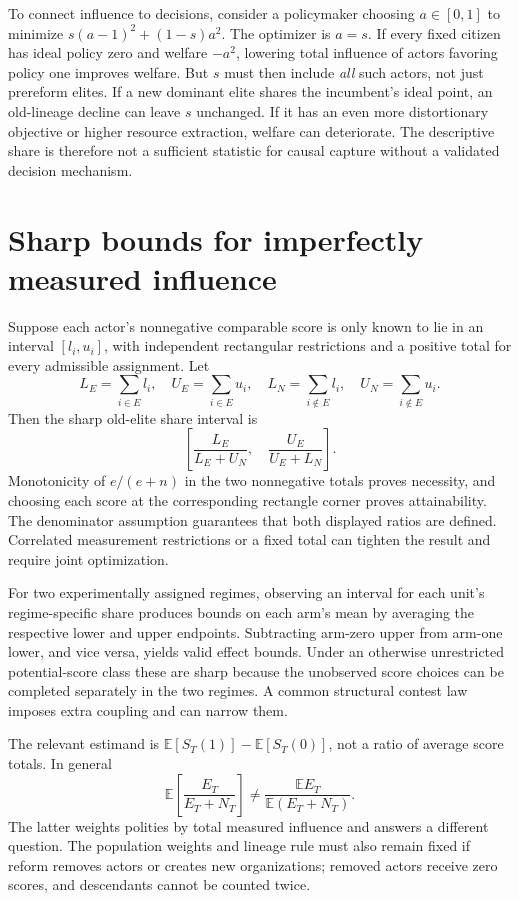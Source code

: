\documentclass[11pt]{article}
\newcommand{\E}{\mathbb E}
\begin{document}
To connect influence to decisions, consider a policymaker choosing $a\in[0,1]$ to minimize $s(a-1)^2+(1-s)a^2$. The optimizer is $a=s$. If every fixed citizen has ideal policy zero and welfare $-a^2$, lowering total influence of actors favoring policy one improves welfare. But $s$ must then include \emph{all} such actors, not just prereform elites. If a new dominant elite shares the incumbent's ideal point, an old-lineage decline can leave $s$ unchanged. If it has an even more distortionary objective or higher resource extraction, welfare can deteriorate. The descriptive share is therefore not a sufficient statistic for causal capture without a validated decision mechanism.

\section*{Sharp bounds for imperfectly measured influence}
Suppose each actor's nonnegative comparable score is only known to lie in an interval $[l_i,u_i]$, with independent rectangular restrictions and a positive total for every admissible assignment. Let
\[
 L_E=\sum_{i\in E}l_i,\quad U_E=\sum_{i\in E}u_i,
 \quad L_N=\sum_{i\notin E}l_i,\quad U_N=\sum_{i\notin E}u_i.
\]
Then the sharp old-elite share interval is
\[
 \left[\frac{L_E}{L_E+U_N},\quad
       \frac{U_E}{U_E+L_N}\right].\tag{2}
\]
Monotonicity of $e/(e+n)$ in the two nonnegative totals proves necessity, and choosing each score at the corresponding rectangle corner proves attainability. The denominator assumption guarantees that both displayed ratios are defined. Correlated measurement restrictions or a fixed total can tighten the result and require joint optimization.

For two experimentally assigned regimes, observing an interval for each unit's regime-specific share produces bounds on each arm's mean by averaging the respective lower and upper endpoints. Subtracting arm-zero upper from arm-one lower, and vice versa, yields valid effect bounds. Under an otherwise unrestricted potential-score class these are sharp because the unobserved score choices can be completed separately in the two regimes. A common structural contest law imposes extra coupling and can narrow them.

The relevant estimand is $\E[S_T(1)]-\E[S_T(0)]$, not a ratio of average score totals. In general
\[
 \E\left[\frac{E_T}{E_T+N_T}\right]
 \ne\frac{\E E_T}{\E(E_T+N_T)}.
\]
The latter weights polities by total measured influence and answers a different question. The population weights and lineage rule must also remain fixed if reform removes actors or creates new organizations; removed actors receive zero scores, and descendants cannot be counted twice.
\end{document}
